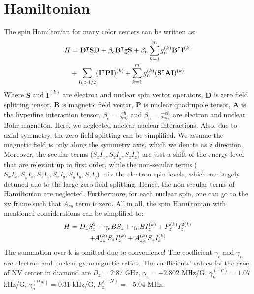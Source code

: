 \documentclass[%
 reprint,
superscriptaddress,
 amsmath,amssymb,
 aps,
]{revtex4-2}
\begin{document}
\section{Hamiltonian}
\label{app:Hamiltonian}
The spin Hamiltonian for many color centers can be written as\cite{Schweiger2001Principles}:
\begin{gather}
	H = \mathbf{D}^\intercal \mathbf{S} \mathbf{D} + \beta_e \mathbf{B}^\intercal \mathbf{g} \mathbf{S} + \beta_n \sum_{k=1}^m g_n^{(k)}  \mathbf{B}^\intercal \mathbf{I}^{(k)} \notag \\
	+ \sum_{I_k>1/2} (\mathbf{I}^{\intercal} \mathbf{P} \mathbf{I})^{(k)} + \sum_{k=1}^m g_n^{(k)} (\mathbf{S}^\intercal \mathbf{A} \mathbf{I})^{(k)}
\end{gather}
Where $\mathbf{S}$ and $\mathbf{I}^{(k)}$ are electron and nuclear spin vector operators, $\mathbf{D}$ is zero field splitting tensor, $\mathbf{B}$ is magnetic field vector, $\mathbf{P}$ is nuclear quadrupole tensor, $\mathbf{A}$ is the hyperfine interaction tensor, $\beta_e = \frac{e \hbar}{2m_e}$ and $\beta_n = \frac{-e \hbar}{2m_n}$ are electron and nuclear Bohr magneton. Here, we neglected  nuclear-nuclear interactions. Also, due to axial symmetry, the zero field splitting can be simplified. We assume the magnetic field is only along the symmetry axis, which we denote as z direction. Moreover, the secular terms ($S_zI_x, S_zI_y, S_zI_z$) are just a shift of the energy level that are relevant up to first order, while the non-secular terms ($S_xI_x, S_yI_x, S_zI_z, S_xI_y, S_yI_y, S_zI_y$) mix the electron spin levels, which are largely detuned due to the large zero field splitting. Hence, the non-secular terms of Hamiltonian are neglected. Furthermore, for each nuclear spin, one can go to the xy frame such that $A_{zy}$ term is zero. All in all, the spin Hamiltonian with mentioned considerations can be simplified to:
\begin{gather}
	H = D_z S_z^2 + \gamma_e B S_z + \gamma_n B I_z^{(k)} + P_z^{(k)} I_z^{2(k)} \notag \\
	+ A_{zz}^{(k)} S_z I_z^{(k)} + A_{zx}^{(k)} S_z I_x^{(k)}
\end{gather}
The summation over k is omitted due to convenience!
The coefficient $\gamma_e$ and $\gamma_n$ are electron and nuclear gyromagnetic ratios. The coefficients' values for the case of NV center in diamond are $D_z= 2.87$ GHz, $\gamma_e= -2.802$ MHz/G, $\gamma_n^{(^{13}C)}= 1.07$ kHz/G, $\gamma_n^{(^{14}N)}= 0.31$ kHz/G, $P_z^{(^{14}N)}= -5.04$ MHz. \\
\end{document}

